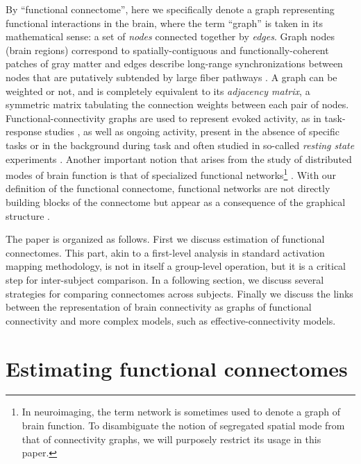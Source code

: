 \documentclass[5p]{elsarticle}
\begin{document}
By ``functional connectome'', here we specifically denote a graph representing
functional interactions in the brain, where the term ``graph'' is taken in its
mathematical sense: a set of \emph{nodes} connected together by \emph{edges}.
Graph nodes (brain regions) correspond to spatially-contiguous and 
functionally-coherent patches of gray matter and edges describe long-range synchronizations between nodes
that are putatively subtended by large fiber pathways \cite{marrelec2006b}.  A
graph can be weighted or not, and is completely equivalent to its
\emph{adjacency matrix}, a symmetric matrix tabulating the connection weights
between each pair of nodes.  Functional-connectivity graphs are used to
represent evoked activity, as in task-response studies \cite{mcintosh2000}, as
well as ongoing activity, present in the absence of specific tasks or in the
background during task and often studied in so-called \emph{resting state}
experiments \cite{raichle2010}. Another important notion that arises from the
study of distributed modes of brain function is that of specialized functional
networks\footnote{In neuroimaging, the term network is sometimes used to denote
	a graph of brain function. To disambiguate the notion of segregated
	spatial mode \cite{fox2005} from that of connectivity graphs, we will
	purposely restrict its usage in this paper.} \cite{fox2005}. With our
definition of the functional connectome, functional networks are not directly
building blocks of the connectome but appear as a consequence of the graphical
structure \cite{varoquaux2010c,varoquaux2012}.

The paper is organized as follows. First we discuss estimation of functional
connectomes. This part, akin to a first-level analysis in standard activation
mapping methodology, is not in itself a group-level operation, but it is a
critical step for inter-subject comparison.  In a following section, we discuss
several strategies for comparing connectomes across subjects. Finally we discuss
the links between the representation of brain connectivity as graphs of
functional connectivity and more complex models, such as effective-connectivity
models.



\section{Estimating functional connectomes}
\end{document}
